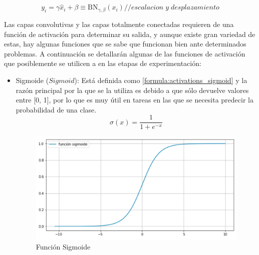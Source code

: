  \begin{equation}\label{formula:bn_scale_and_shift}
 y_{i} = \gamma \widehat{x}_{i}+\beta \equiv \mathrm{B} \mathrm{N}_{\gamma, \beta}\left(x_{i}\right) {// escalacion \; y \; desplazamiento}
 \end{equation}
 
 Las capas convolutivas y las capas totalmente conectadas requieren de una función de activación para determinar su salida, y aunque existe gran variedad de estas, hay algunas funciones que se sabe que funcionan bien ante determinados problemas. A continuación se detallarán algunas de las funciones de activación que posiblemente se utilicen a en las etapas de experimentación:
 \begin{itemize}
 	\item Sigmoide (\(Sigmoid\)): Está definida como \ref{formula:activations_sigmoid} y la razón principal por la que se la utiliza es debido a que sólo devuelve valores entre [0, 1], por lo que es muy útil en tareas en las que se necesita predecir la probabilidad de una clase. 
 	\begin{equation}\label{formula:activations_sigmoid}
 	\sigma(x)=\frac{1}{1+e^{-x}}
 	\end{equation}
 	\begin{figure}[!ht]
 		\centering
 		\includegraphics[width=0.7\linewidth]{images/activations_sigmoid}
 		\caption[Función Sigmoide]{Función Sigmoide}
 		\label{fig:sigmoid}
 	\end{figure}
 	

\end{itemize}
